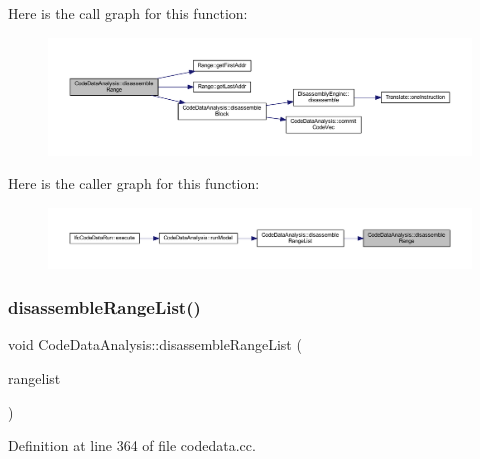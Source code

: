 Here is the call graph for this function\+:
\nopagebreak
\begin{figure}[H]
\begin{center}
\leavevmode
\includegraphics[width=350pt]{class_code_data_analysis_a723b35a19d5263fbcc3ed8b31e244758_cgraph}
\end{center}
\end{figure}
Here is the caller graph for this function\+:
\nopagebreak
\begin{figure}[H]
\begin{center}
\leavevmode
\includegraphics[width=350pt]{class_code_data_analysis_a723b35a19d5263fbcc3ed8b31e244758_icgraph}
\end{center}
\end{figure}
\mbox{\label{class_code_data_analysis_a150d37b82ebb1e11dea740e5b0d370d5}} 
\subsubsection{\texorpdfstring{disassembleRangeList()}{disassembleRangeList()}}
{\footnotesize\ttfamily void Code\+Data\+Analysis\+::disassemble\+Range\+List (\begin{DoxyParamCaption}\item[{const \mbox{\hyperlink{class_range_list}{Range\+List}} \&}]{rangelist }\end{DoxyParamCaption})}



Definition at line 364 of file codedata.\+cc.


